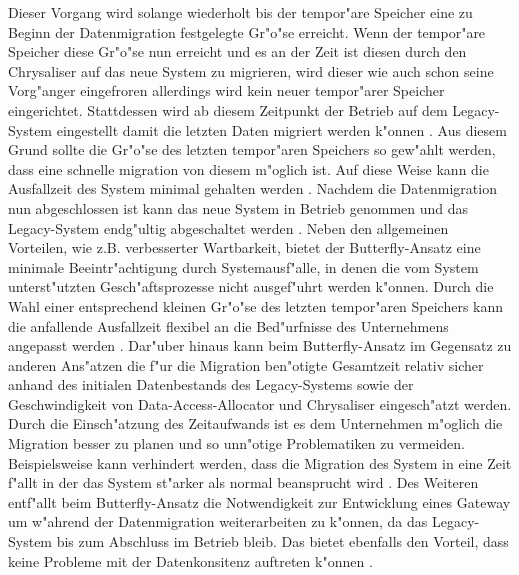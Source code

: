 \lb
Dieser Vorgang wird solange wiederholt bis der tempor"are Speicher eine zu Beginn der Datenmigration festgelegte Gr"o"se erreicht. Wenn der tempor"are Speicher diese Gr"o"se nun erreicht und es an der Zeit ist diesen durch den Chrysaliser auf das neue System zu migrieren, wird dieser wie auch schon seine Vorg"anger eingefroren allerdings wird kein neuer tempor"arer Speicher eingerichtet. Stattdessen wird ab diesem Zeitpunkt der Betrieb auf dem Legacy-System eingestellt damit die letzten Daten migriert werden k"onnen \citep[S.~202]{wuLawlessBisbal-1997}. Aus diesem Grund sollte die Gr"o"se des letzten tempor"aren Speichers so gew"ahlt werden, dass eine schnelle migration von diesem m"oglich ist. Auf diese Weise kann die Ausfallzeit des System minimal gehalten werden \citep[S.~202]{wuLawlessBisbal-1997}. Nachdem die Datenmigration nun abgeschlossen ist kann das neue System in Betrieb genommen und das Legacy-System endg"ultig abgeschaltet werden \citep[S.~204]{wuLawlessBisbal-1997}.
\lb
Neben den allgemeinen Vorteilen, wie z.B. verbesserter Wartbarkeit, bietet der Butterfly-Ansatz eine minimale Beeintr"achtigung durch Systemausf"alle, in denen die vom System unterst"utzten Gesch"aftsprozesse nicht ausgef"uhrt werden k"onnen. Durch die Wahl einer entsprechend kleinen Gr"o"se des letzten tempor"aren Speichers kann die anfallende Ausfallzeit flexibel an die Bed"urfnisse des Unternehmens angepasst werden \citep[S.~204f.]{wuLawlessBisbal-1997}. Dar"uber hinaus kann beim Butterfly-Ansatz im Gegensatz zu anderen Ans"atzen die f"ur die Migration ben"otigte Gesamtzeit relativ sicher anhand des initialen Datenbestands des Legacy-Systems sowie der Geschwindigkeit von Data-Access-Allocator und Chrysaliser eingesch"atzt werden. Durch die Einsch"atzung des Zeitaufwands ist es dem Unternehmen m"oglich die Migration besser zu planen und so unn"otige Problematiken zu vermeiden. Beispielsweise kann verhindert werden, dass die Migration des System in eine Zeit f"allt in der das System st"arker als normal beansprucht wird \cite[S.~204]{wuLawlessBisbal-1997}. Des Weiteren entf"allt beim Butterfly-Ansatz die Notwendigkeit zur Entwicklung eines Gateway um w"ahrend der Datenmigration weiterarbeiten zu k"onnen, da das Legacy-System bis zum Abschluss im Betrieb bleib. Das bietet ebenfalls den Vorteil, dass keine Probleme mit der Datenkonsitenz auftreten k"onnen \citep[S.~3]{wuLawless-1997}.
\lb
